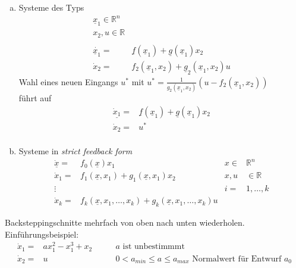 \documentclass[ngerman]{tudscrreprt}
\begin{document}
\begin{enumerate}[a)]
\item Systeme des Typs
\begin{align*} 
\underline x_1 \in \mathbb{R}^n\\
x_2, u \in \mathbb{R}\\\\
\dot{\underline x_1} =&\underline f(\underline x_1) + \underline g(\underline x_1)x_2\\
\dot x_2 =& f_2(\underline x_1,x_2) + \underline g_2(\underline x_1,x_2)u
\end{align*} Wahl eines neuen Eingangs $u^*$ mit $u^* = \frac{1}{g_2(\underline x_1,x_2)} (u - f_2(\underline x_1, x_2))$\\
führt auf 
\begin{align*}
\underline{\dot x_1} = & \underline f(\underline x_1) + \underline g(\underline x_1)x_2\\
\dot x_2 = & u^*\\
\end{align*}
\item Systeme in \textit{ strict feedback form}
\begin{align*}
\underline{\dot x} = &f_0(\underline x) x_1 \qquad &x\in& \mathbb{R}^n\\
\dot x_1 =& f_1(\underline x,x_1) + g_1(\underline x,x_1)x_2 & x,u&\in \mathbb{R} \\
\vdots & &i =&1,\dots ,k \\
\dot x_k =& f_k(\underline x,x_1,\dots,x_k)+ g_k(\underline x,x_1,\dots,x_k)u
\end{align*}
\end{enumerate}
Backsteppingschnitte mehrfach von oben nach unten wiederholen.\\
Einführungsbeispiel: 
\begin{align*}
\dot x_1 = & a x_1^2 - x_1^3 + x_2 \qquad &a \text{ ist unbestimmmt}\\
\dot x_2 = & u & 0 < a_{min} \le a \le a_{max} \text{  Normalwert für Entwurf }a_0
\end{align*}
\end{document}

